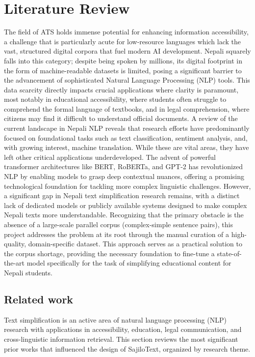 \documentclass[12pt]{report}
\begin{document}
\chapter{Literature Review}
The field of ATS holds immense potential for enhancing information accessibility, a challenge that is particularly acute for low-resource languages which lack the vast, structured digital corpora that fuel modern AI development. Nepali squarely falls into this category; despite being spoken by millions, its digital footprint in the form of machine-readable datasets is limited, posing a significant barrier to the advancement of sophisticated Natural Language Processing (NLP) tools. This data scarcity directly impacts crucial applications where clarity is paramount, most notably in educational accessibility, where students often struggle to comprehend the formal language of textbooks, and in legal comprehension, where citizens may find it difficult to understand official documents. A review of the current landscape in Nepali NLP reveals that research efforts have predominantly focused on foundational tasks such as text classification, sentiment analysis, and, with growing interest, machine translation. While these are vital areas, they have left other critical applications underdeveloped. The advent of powerful transformer architectures like BERT, RoBERTa, and GPT-2 has revolutionized NLP by enabling models to grasp deep contextual nuances, offering a promising technological foundation for tackling more complex linguistic challenges. However, a significant gap in Nepali text simplification research remains, with a distinct lack of dedicated models or publicly available systems designed to make complex Nepali texts more understandable. Recognizing that the primary obstacle is the absence of a large-scale parallel corpus (complex-simple sentence pairs), this project addresses the problem at its root through the manual curation of a high-quality, domain-specific dataset. This approach serves as a practical solution to the corpus shortage, providing the necessary foundation to fine-tune a state-of-the-art model specifically for the task of simplifying educational content for Nepali students.
\section{Related work}
Text simplification is an active area of natural language processing (NLP) research with applications in accessibility, education, legal communication, and cross-linguistic information retrieval. This section reviews the most significant prior works that influenced the design of SajiloText, organized by research theme.
\end{document}
